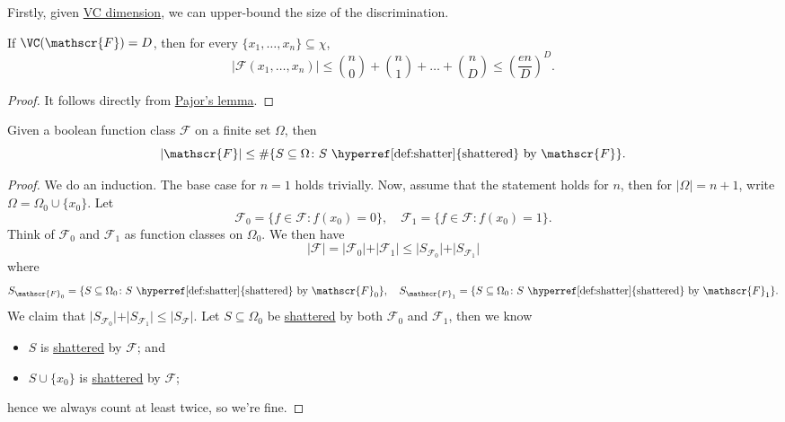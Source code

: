 Firstly, given \hyperref[def:VC-dimension]{VC dimension}, we can upper-bound the size of the discrimination.

\begin{lemma}\label{lma:Sauer-Shelah}
  If \(\VC(\mathscr{F}) = D\), then for every \(\{ x_1, \dots , x_n \} \subseteq \chi \),
  \[
    \vert \mathscr{F} (x_1, \dots , x_n) \vert
    \leq \binom{n}{0} + \binom{n}{1} + \dots + \binom{n}{D}
    \leq \left( \frac{en}{D} \right) ^D.
  \]
\end{lemma}
\begin{proof}
  It follows directly from \hyperref[lma:Pajor]{Pajor's lemma}.
\end{proof}

\begin{lemma}\label{lma:Pajor}
  Given a boolean function class \(\mathscr{F} \) on a finite set \(\Omega \), then
  \[
    \vert \mathscr{F} \vert \leq \#\{ S \subseteq \Omega \colon S \text{ \hyperref[def:shatter]{shattered} by } \mathscr{F} \}.
  \]
\end{lemma}
\begin{proof}
  We do an induction. The base case for \(n = 1\) holds trivially. Now, assume that the statement holds for \(n\), then for \(\vert \Omega \vert = n+1\), write \(\Omega = \Omega _0 \cup \{ x_0 \} \). Let
  \[
    \mathscr{F} _0 = \{ f\in \mathscr{F} \colon f(x_0) = 0\} ,\quad
    \mathscr{F} _1 = \{ f\in \mathscr{F} \colon f(x_0) = 1\} .
  \]
  Think of \(\mathscr{F} _0\) and \(\mathscr{F} _1\) as function classes on \(\Omega _0\). We then have
  \[
    \vert \mathscr{F} \vert
    = \vert \mathscr{F} _0 \vert + \vert \mathscr{F} _1 \vert
    \leq \vert S_{\mathscr{F} _0} \vert + \vert S_{\mathscr{F} _1} \vert
  \]
  where
  \[
    S_{\mathscr{F} _0} = \{ S \subseteq \Omega _0 \colon S \text{ \hyperref[def:shatter]{shattered} by } \mathscr{F} _0 \} ,\quad
    S_{\mathscr{F} _1} = \{ S \subseteq \Omega _0 \colon S \text{ \hyperref[def:shatter]{shattered} by } \mathscr{F} _1 \}.
  \]
  We claim that \(\vert S_{\mathscr{F} _0} \vert + \vert S_{\mathscr{F} _1} \vert \leq \vert S _{\mathscr{F} } \vert\). Let \(S \subseteq \Omega _0\) be \hyperref[def:shatter]{shattered} by both \(\mathscr{F} _0\) and \(\mathscr{F} _1\), then we know
  \begin{itemize}
    \item \(S\) is \hyperref[def:shatter]{shattered} by \(\mathscr{F} \); and
    \item \(S \cup \{ x_0 \} \) is \hyperref[def:shatter]{shattered} by \(\mathscr{F} \);
  \end{itemize}
  hence we always count at least twice, so we're fine.
\end{proof}


